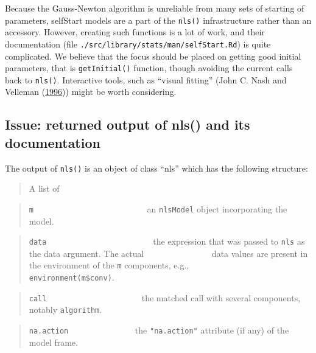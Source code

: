 \documentclass[
]{article}
\begin{document}
Because the Gauss-Newton algorithm is unreliable from many sets of
starting of parameters, selfStart models are a part of the
\texttt{nls()} infrastructure rather than an accessory. However,
creating such functions is a lot of work, and their documentation (file
\texttt{./src/library/stats/man/selfStart.Rd}) is quite complicated. We
believe that the focus should be placed on getting good initial
parameters, that is \texttt{getInitial()} function, though avoiding the
current calls back to \texttt{nls()}. Interactive tools, such as
``visual fitting'' (John C. Nash and Velleman
(\protect\hyperlink{ref-nash1996nonlinear}{1996})) might be worth
considering.

\hypertarget{issue-returned-output-of-nls-and-its-documentation}{%
\subsection{Issue: returned output of nls() and its
documentation}\label{issue-returned-output-of-nls-and-its-documentation}}

The output of \texttt{nls()} is an object of class ``nls'' which has the
following structure:

\begin{quote}
A list of
\end{quote}

\begin{quote}
\texttt{m} ~ ~ ~ ~ ~ ~ ~ ~ ~ ~ ~ ~ ~ ~ ~~ an \texttt{nlsModel} object
incorporating the model.
\end{quote}

\begin{quote}
\texttt{data} ~ ~ ~ ~ ~ ~ ~ ~ ~ ~ ~ ~ ~ ~ ~the expression that was
passed to \texttt{nls} as the data argument. The actual \newline
\(~~~~~~~~~~~~~~~~~~~~~~~~~~~~~~~~~\) data values are present in the
environment of the \texttt{m} components, e.g.,
\newline \(~~~~~~~~~~~~~~~~~~~~~~~~~~~~~~~~~\)
\texttt{environment(m\$conv)}.
\end{quote}

\begin{quote}
\texttt{call} ~ ~ ~ ~ ~ ~ ~ ~ ~ ~ ~ ~ ~ the matched call with several
components, notably \texttt{algorithm}.
\end{quote}

\begin{quote}
\texttt{na.action} ~ ~ ~ ~ ~ ~ ~ ~ ~ the \texttt{"na.action"} attribute
(if any) of the model frame.
\end{quote}
\end{document}
